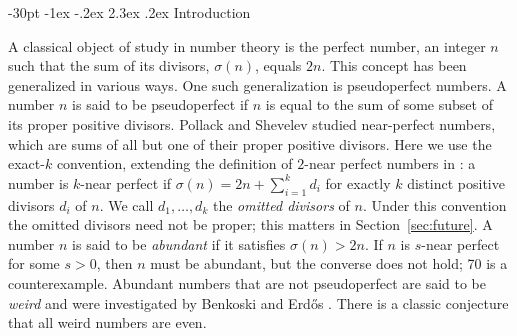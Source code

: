 \documentclass[10pt]{article}
\makeatletter
\renewcommand\section{\@startsection {section}{1}{\z@}
{-30pt \@plus -1ex \@minus -.2ex}
{2.3ex \@plus.2ex}
{\normalfont\normalsize\bfseries\boldmath}}
\theoremstyle{definition}
\makeatother
\begin{document}
\pagestyle{myheadings}
\markright{} %
\thispagestyle{empty}
\baselineskip=12.875pt
\vskip 30pt



\section{Introduction}

A classical object of study in number theory is the perfect number, an integer $n$ such that the sum of its divisors, $\sigma(n)$, equals $2n$. This concept has been generalized in various ways. One such generalization is pseudoperfect numbers. A number $n$ is said to be pseudoperfect if $n$ is equal to the sum of some subset of its proper positive divisors. %
Pollack and Shevelev \cite{PS} studied near-perfect numbers, which are sums of all but one of their proper positive divisors. Here we use the exact-$k$ convention, extending the definition of $2$-near perfect numbers in \cite{AMPSZ}: a number is $k$-near perfect if $\sigma(n) = 2n + \sum_{i=1}^k d_i$ for exactly $k$ distinct positive divisors $d_i$ of $n$. We call $d_1,\ldots,d_k$ the \textit{omitted divisors} of $n$. Under this convention the omitted divisors need not be proper; this matters in Section~\ref{sec:future}. A number $n$ is said to be \textit{abundant} if it satisfies $\sigma(n) > 2n$. If $n$ is $s$-near perfect for some $s>0$, then $n$ must be abundant, but the converse does not hold; 70 is a counterexample. Abundant numbers that are not pseudoperfect are said to be \textit{weird} and were investigated by Benkoski and Erd\H{o}s \cite{BE}. There is a classic conjecture that all weird numbers are even.
\end{document}
